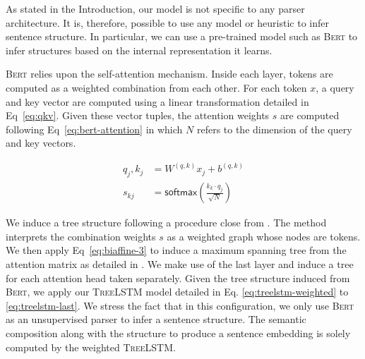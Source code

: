 As stated in the Introduction, our model is not specific to any parser architecture. It is, therefore, possible to use any model or heuristic to infer sentence structure. 
In particular, we can use a pre-trained model such as \textsc{Bert} to infer structures based on the internal representation it learns.

\textsc{Bert} relies upon the self-attention mechanism. Inside each layer, tokens are computed as a weighted combination from each other. For each token $x$, a query and key vector are computed using a linear transformation detailed in Eq~\ref{eq:qkv}. Given these vector tuples, the attention weights $s$ are computed following Eq~\ref{eq:bert-attention} in which $N$ refers to the dimension of the query and key vectors.

\begin{align}
    q_j, k_j &= W^{(q, k)} x_j + b^{(q, k)} \label{eq:qkv}\\
    s_{kj} &= \mathsf{softmax}\left(\frac{k_{k} \cdot q_{j}}{\sqrt{N}}\right) \label{eq:bert-attention}
\end{align}

We induce a tree structure following a procedure close from \textcite{ravishankar_21}. The method interprets the combination weights $s$ as a weighted graph whose nodes are tokens. We then apply Eq~\ref{eq:biaffine-3} to induce a maximum spanning tree from the attention matrix as detailed in . We make use of the last layer and induce a tree for each attention head taken separately. Given the tree structure induced from \textsc{Bert}, we apply our \textsc{TreeLSTM} model detailed in Eq. \ref{eq:treelstm-weighted} to \ref{eq:treelstm-last}. We stress the fact that in this configuration, we only use \textsc{Bert} as an unsupervised parser to infer a sentence structure. The semantic composition along with the structure to produce a sentence embedding is solely computed by the weighted \textsc{TreeLSTM}.

